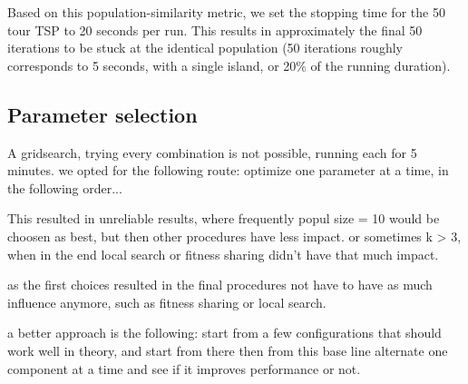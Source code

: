 \documentclass[a4paper,10pt]{article}
\newcommand{\ReplaceMe}[1]{{\color{blue}#1}}
\begin{document}
Based on this population-similarity metric, we set the stopping time for the 50 tour TSP to 20 seconds per run. This results in approximately the final 50 iterations to be stuck at the identical population (50 iterations roughly corresponds to 5 seconds, with a single island, or 20\% of the running duration).



\subsection{Parameter selection}
	A gridsearch, trying every combination is not possible, running each for 5 minutes.
	we opted for the following route:
	optimize one parameter at a time, in the following order...
	
	This resulted in unreliable results, where frequently popul size = 10 would be choosen as best, but then other procedures have less impact. or sometimes k > 3, 
	when in the end local search or fitness sharing didn't have that much impact.
	
	as the first choices resulted in the final procedures not have to have as much influence anymore, such as fitness sharing or local search.
	
	a better approach is the following:
	start from a few configurations that should work well in theory, and start from there
	then from this base line alternate one component at a time and see if it improves performance or not.


	
\end{document}
